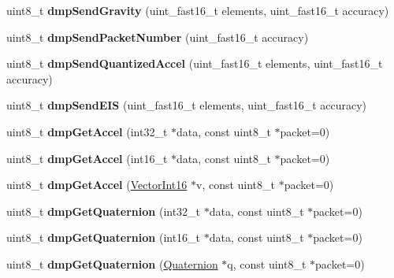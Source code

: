 \begin{DoxyCompactItemize}
uint8\+\_\+t {\bfseries dmp\+Send\+Gravity} (uint\+\_\+fast16\+\_\+t elements, uint\+\_\+fast16\+\_\+t accuracy)
\item 
\mbox{\label{class_m_p_u6050_a92d59a9b70509fec913f86e3ba2788e1}} 
uint8\+\_\+t {\bfseries dmp\+Send\+Packet\+Number} (uint\+\_\+fast16\+\_\+t accuracy)
\item 
\mbox{\label{class_m_p_u6050_a7383c4681b040cefc31d472362b7aeb2}} 
uint8\+\_\+t {\bfseries dmp\+Send\+Quantized\+Accel} (uint\+\_\+fast16\+\_\+t elements, uint\+\_\+fast16\+\_\+t accuracy)
\item 
\mbox{\label{class_m_p_u6050_a628d208cf85fcf46b3e100880e332e19}} 
uint8\+\_\+t {\bfseries dmp\+Send\+E\+IS} (uint\+\_\+fast16\+\_\+t elements, uint\+\_\+fast16\+\_\+t accuracy)
\item 
\mbox{\label{class_m_p_u6050_a113be793514449548008fe1eae5459ef}} 
uint8\+\_\+t {\bfseries dmp\+Get\+Accel} (int32\+\_\+t $\ast$data, const uint8\+\_\+t $\ast$packet=0)
\item 
\mbox{\label{class_m_p_u6050_a7fdca0e0bf7d8a20818c28d4ed734647}} 
uint8\+\_\+t {\bfseries dmp\+Get\+Accel} (int16\+\_\+t $\ast$data, const uint8\+\_\+t $\ast$packet=0)
\item 
\mbox{\label{class_m_p_u6050_a31018c8a11a8a87725faab59bb948da7}} 
uint8\+\_\+t {\bfseries dmp\+Get\+Accel} (\mbox{\hyperlink{class_vector_int16}{Vector\+Int16}} $\ast$v, const uint8\+\_\+t $\ast$packet=0)
\item 
\mbox{\label{class_m_p_u6050_aac2d2a0de3fd26e37b8341206fc26260}} 
uint8\+\_\+t {\bfseries dmp\+Get\+Quaternion} (int32\+\_\+t $\ast$data, const uint8\+\_\+t $\ast$packet=0)
\item 
\mbox{\label{class_m_p_u6050_a96eacd8075f484bad2376c95b0defb26}} 
uint8\+\_\+t {\bfseries dmp\+Get\+Quaternion} (int16\+\_\+t $\ast$data, const uint8\+\_\+t $\ast$packet=0)
\item 
\mbox{\label{class_m_p_u6050_a712866736969fb002303c55effc627cb}} 
uint8\+\_\+t {\bfseries dmp\+Get\+Quaternion} (\mbox{\hyperlink{class_quaternion}{Quaternion}} $\ast$q, const uint8\+\_\+t $\ast$packet=0)

\end{DoxyCompactItemize}

